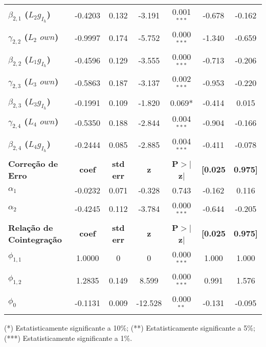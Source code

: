 \begin{threeparttable}
\begin{tabular}{lcccccc}
		\textbf{$\beta_{2,1}$ ($L_2 g_{I_h}$)}           &      -0.4203  &        0.132     &    -3.191  &         0.001$^{***}$        &       -0.678    &       -0.162     \\
		\textbf{$\gamma_{2,2}$ ($L_2$ $own$)} &      -0.9997  &        0.174     &    -5.752  &         0.000$^{***}$        &       -1.340    &       -0.659     \\
		\textbf{$\beta_{2,2}$ ($L_1 g_{I_h}$)}           &      -0.4596  &        0.129     &    -3.555  &         0.000$^{***}$        &       -0.713    &       -0.206     \\
		\textbf{$\gamma_{2,3}$ ($L_3$ $own$)} &      -0.5863  &        0.187     &    -3.137  &         0.002$^{***}$        &       -0.953    &       -0.220     \\
		\textbf{$\beta_{2,3}$ ($L_3 g_{I_h}$)}           &      -0.1991  &        0.109     &    -1.820  &         0.069*        &       -0.414    &        0.015     \\
		\textbf{$\gamma_{2,4}$ ($L_4$ $own$)} &      -0.5350  &        0.188     &    -2.844  &         0.004$^{***}$        &       -0.904    &       -0.166     \\
		\textbf{$\beta_{2,4}$ ($L_4 g_{I_h}$)}           &      -0.2444  &        0.085     &    -2.885  &         0.004$^{***}$        &       -0.411    &       -0.078     \\
		\midrule
		\textbf{Correção de Erro} & \textbf{coef} & \textbf{std err} & \textbf{z} & \textbf{P$> |$z$|$} & \textbf{[0.025} & \textbf{0.975]}  \\
		\midrule
		\textbf{$\alpha_1$} &      -0.0232  &        0.071     &    -0.328  &         0.743        &       -0.162    &        0.116     \\
		\textbf{$\alpha_2$} &      -0.4245  &        0.112     &    -3.784  &         0.000$^{***}$        &       -0.644    &       -0.205     \\
		\midrule
		\textbf{Relação de Cointegração} & \textbf{coef} & \textbf{std err} & \textbf{z} & \textbf{P$> |$z$|$} & \textbf{[0.025} & \textbf{0.975]}  \\
		\midrule
		\textbf{$\phi_{1,1}$} &       1.0000  &            0     &         0  &         0.000$^{***}$        &        1.000    &        1.000     \\
		\textbf{$\phi_{1,2}$} &       1.2835  &        0.149     &     8.599  &         0.000$^{***}$        &        0.991    &        1.576     \\
		\textbf{$\phi_0$}  &      -0.1131  &        0.009     &   -12.528  &         0.000$^{**}$       &       -0.131    &       -0.095     \\
		\hline
		\hline
	\end{tabular}
\footnotesize{(*) Estatisticamente significante a 10\%; (**) Estatisticamente significante a 5\%; (***) Estatisticamente significante a 1\%.}
\end{threeparttable}